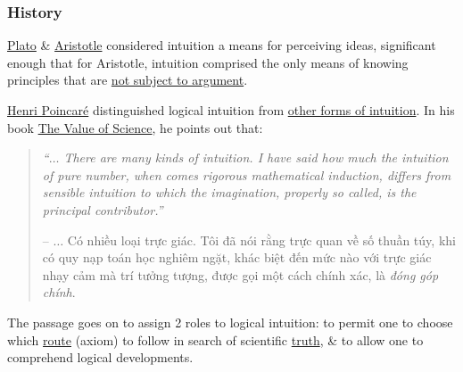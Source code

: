 \documentclass{article}
\begin{document}
\subsubsection{History}
\href{https://en.wikipedia.org/wiki/Plato}{Plato} \& \href{https://en.wikipedia.org/wiki/Aristotle}{Aristotle} considered intuition a means for perceiving ideas, significant enough that for Aristotle, intuition comprised the only means of knowing principles that are \href{https://en.wikipedia.org/wiki/A_priori_and_a_posteriori}{not subject to argument}.

\href{https://en.wikipedia.org/wiki/Henri_Poincar%C3%A9}{\sc Henri Poincar\'e} distinguished logical intuition from \href{https://en.wikipedia.org/wiki/Intuition}{other forms of intuition}. In his book \href{https://en.wikipedia.org/wiki/The_Value_of_Science}{The Value of Science}, he points out that:
\begin{quote}
	{\it``$\ldots$ There are many kinds of intuition. I have said how much the intuition of pure number, when comes rigorous mathematical induction, differs from sensible intuition to which the imagination, properly so called, is the {\it principal contributor}.''}
	
	-- $\ldots$ Có nhiều loại trực giác. Tôi đã nói rằng trực quan về số thuần túy, khi có quy nạp toán học nghiêm ngặt, khác biệt đến mức nào với trực giác nhạy cảm mà trí tưởng tượng, được gọi một cách chính xác, là {\it đóng góp chính}.	
\end{quote}
The passage goes on to assign 2 roles to logical intuition: to permit one to choose which \href{https://en.wikipedia.org/wiki/Axiom}{route} (axiom) to follow in search of scientific \href{https://en.wikipedia.org/wiki/Truth}{truth}, \& to allow one to comprehend logical developments.
\end{document}
